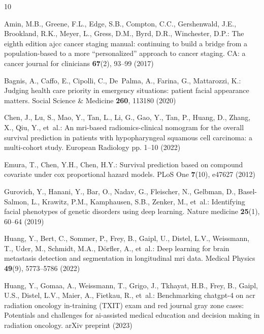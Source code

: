 \documentclass[runningheads]{llncs}
\newcommand{\TODO}[1]{\textcolor{red}{#1}}
\begin{document}
%
%
\begin{thebibliography}{10}
\providecommand{\url}[1]{\texttt{#1}}
\providecommand{\urlprefix}{URL }
\providecommand{\doi}[1]{https://doi.org/#1}

Amin, M.B., Greene, F.L., Edge, S.B., Compton, C.C., Gershenwald, J.E.,
  Brookland, R.K., Meyer, L., Gress, D.M., Byrd, D.R., Winchester, D.P.: The
  eighth edition ajcc cancer staging manual: continuing to build a bridge from
  a population-based to a more “personalized” approach to cancer staging.
  CA: a cancer journal for clinicians  \textbf{67}(2),  93--99 (2017)

Bagnis, A., Caffo, E., Cipolli, C., De~Palma, A., Farina, G., Mattarozzi, K.:
  Judging health care priority in emergency situations: patient facial
  appearance matters. Social Science \& Medicine  \textbf{260},  113180 (2020)

Chen, J., Lu, S., Mao, Y., Tan, L., Li, G., Gao, Y., Tan, P., Huang, D., Zhang,
  X., Qiu, Y., et~al.: An mri-based radiomics-clinical nomogram for the overall
  survival prediction in patients with hypopharyngeal squamous cell carcinoma:
  a multi-cohort study. European Radiology pp. 1--10 (2022)

Emura, T., Chen, Y.H., Chen, H.Y.: Survival prediction based on compound
  covariate under cox proportional hazard models. PLoS One  \textbf{7}(10),
  e47627 (2012)

Gurovich, Y., Hanani, Y., Bar, O., Nadav, G., Fleischer, N., Gelbman, D.,
  Basel-Salmon, L., Krawitz, P.M., Kamphausen, S.B., Zenker, M., et~al.:
  Identifying facial phenotypes of genetic disorders using deep learning.
  Nature medicine  \textbf{25}(1),  60--64 (2019)

Huang, Y., Bert, C., Sommer, P., Frey, B., Gaipl, U., Distel, L.V., Weissmann,
  T., Uder, M., Schmidt, M.A., D{\"o}rfler, A., et~al.: Deep learning for brain
  metastasis detection and segmentation in longitudinal mri data. Medical
  Physics  \textbf{49}(9),  5773--5786 (2022)

Huang, Y., Gomaa, A., Weissmann, T., Grigo, J., Tkhayat, H.B., Frey, B., Gaipl,
  U.S., Distel, L.V., Maier, A., Fietkau, R., et~al.: Benchmarking chatgpt-4 on
  acr radiation oncology in-training ({TXIT}) exam and red journal gray zone
  cases: Potentials and challenges for ai-assisted medical education and
  decision making in radiation oncology. arXiv preprint  (2023)


\end{thebibliography}
\end{document}
